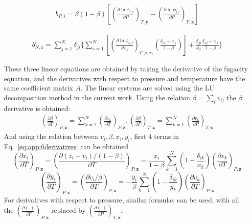 \begin{align}
	b_{P,i}=\beta(1-\beta)\left[\left(\frac{\partial \ln\phi_{i,v}}{\partial P}\right)_{T,\mathbf{y}}-\left(\frac{\partial \ln\phi_{i,l}}{\partial P}\right)_{T,\mathbf{x}}\right]
\end{align}


\begin{align}
	b_{N,k}^i=\sum_{j=1}^N\delta_{ji}\Bigg\{\sum_{s=1}^N\left[\left(\frac{\partial \ln\phi_{k,l}}{\partial x_s}\right)_{T,p,x_s}\left(\frac{\delta_{sj}-x_s}{1-\beta}\right)\right]+\frac{\delta_{ji}}{x_k}\frac{\delta_{kj}-x_k}{1-\beta}\Bigg\}
\end{align}

These three linear equations are obtained by taking the derivative of the fugacity equation, and the derivatives with respect to pressure and temperature have the same coefficient matrix $A$. The linear systems are solved using the LU decomposition method in the current work.
Using the relation $ \beta = \sum_i v_i$, the $\beta $ derivative is obtained:
\begin{align}
	\left(\frac{\partial \beta }{\partial T}\right)_{P,\mathbf{z}} = \sum_{k=1}^N \left(\frac{\partial v_k}{\partial T}\right)_{P,\mathbf{z}},\left(\frac{\partial \beta}{\partial P}\right)_{T,\mathbf{z}} = \sum_{k=1}^N \left(\frac{\partial v_k}{\partial P}\right)_{T,\mathbf{z}} \label{eq:dbetafPT}
\end{align}
And using the relation between $v_i,\beta,x_i,y_i$, first 4 terms in Eq.~\ref{eq:app:6derivatives} can be obtained
$$\left(\frac{\partial x_i}{\partial T}\right)_{P,\mathbf{z}} = \left(\frac{\partial (z_i-v_i)/(1-\beta)}{\partial T}\right)_{P,\mathbf{z}}= \frac{x_i}{1-\beta}\sum_{k=1}^N\left(1-\frac{\delta_{ik}}{x_k}\right)\left(\frac{\partial v_k}{\partial T}\right)_{P,\mathbf{z}}$$
$$\left(\frac{\partial y_i}{\partial T}\right)_{P,\mathbf{z}} = \left(\frac{\partial v_i/\beta}{\partial T}\right)_{P,\mathbf{z}}= -\frac{y_i}{\beta}\sum_{k=1}^N\left(1-\frac{\delta_{ik}}{y_k}\right)\left(\frac{\partial v_k}{\partial T}\right)_{P,\mathbf{z}}$$
For derivatives with respect to pressure, similar formulas can be used, with all the $\left(\frac{\partial (\cdot)}{\partial T}\right)_{P,\mathbf{z}}$ replaced by $\left(\frac{\partial (\cdot)}{\partial P}\right)_{T,\mathbf{z}}$.

